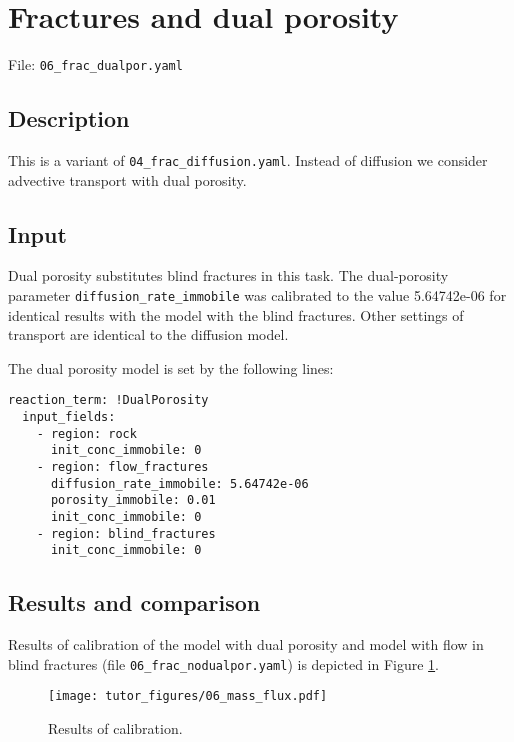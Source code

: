 \section{Fractures and dual porosity}\label{fractures-and-dual-porosity}

File: \texttt{06\_frac\_dualpor.yaml}

\subsection{Description}\label{description}

This is a variant of \texttt{04\_frac\_diffusion.yaml}. Instead of
diffusion we consider advective transport with dual porosity.

\subsection{Input}\label{input}

Dual porosity substitutes blind fractures in this task. The
dual-porosity parameter \texttt{diffusion\_rate\_immobile} was
calibrated to the value 5.64742e-06 for identical results with the model
with the blind fractures. Other settings of transport are identical to
the diffusion model.

The dual porosity model is set by the following lines:

\begin{verbatim}
reaction_term: !DualPorosity
  input_fields:
    - region: rock
      init_conc_immobile: 0
    - region: flow_fractures
      diffusion_rate_immobile: 5.64742e-06
      porosity_immobile: 0.01
      init_conc_immobile: 0
    - region: blind_fractures
      init_conc_immobile: 0
\end{verbatim}

\subsection{Results and comparison}\label{results-and-comparison}

Results of calibration of the model with dual porosity and model with
flow in blind fractures (file \texttt{06\_frac\_nodualpor.yaml}) is
depicted in Figure \ref{fig:calib}.

\begin{figure}[htbp]
\centering
\texttt{[image: tutor\_figures/06\_mass\_flux.pdf]}
\caption{Results of calibration.\label{fig:calib}}
\end{figure}
